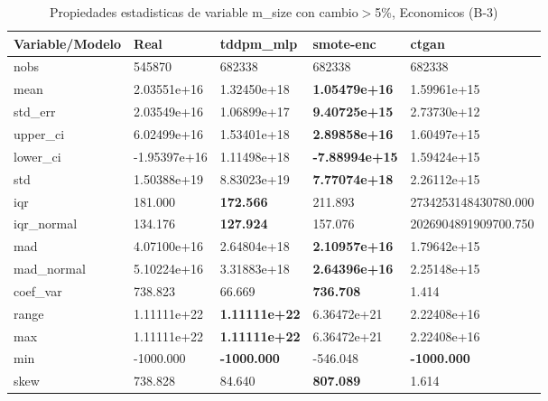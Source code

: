 \begin{table}[H]
\centering
\fontsize{8}{14}\selectfont
\caption{Propiedades estadisticas de variable m\_size con cambio\ensuremath{>}5\%, Economicos (B-3)}
\label{table-stats-economicos-b-3-m_size-short}
\begin{tabular}{|l|m{10em}|m{10em}|m{10em}|m{10em}|}
\hline
 \rowcolor[gray]{0.8}
Variable/Modelo & Real & tddpm\_mlp & smote-enc & ctgan \\
\hline nobs & 545870 & 682338 & 682338 & 682338 \\
\hline mean & 2.03551e+16 & \cellcolor[rgb]{0.9, 0.54, 0.52} 1.32450e+18 & \bfseries 1.05479e+16 & 1.59961e+15 \\
\hline std\_err & 2.03549e+16 & \cellcolor[rgb]{0.9, 0.54, 0.52} 1.06899e+17 & \bfseries 9.40725e+15 & 2.73730e+12 \\
\hline upper\_ci & 6.02499e+16 & \cellcolor[rgb]{0.9, 0.54, 0.52} 1.53401e+18 & \bfseries 2.89858e+16 & 1.60497e+15 \\
\hline lower\_ci & -1.95397e+16 & \cellcolor[rgb]{0.9, 0.54, 0.52} 1.11498e+18 & \bfseries -7.88994e+15 & 1.59424e+15 \\
\hline std & 1.50388e+19 & \cellcolor[rgb]{0.9, 0.54, 0.52} 8.83023e+19 & \bfseries 7.77074e+18 & 2.26112e+15 \\
\hline iqr & 181.000 & \bfseries 172.566 & 211.893 & \cellcolor[rgb]{0.9, 0.54, 0.52} 2734253148430780.000 \\
\hline iqr\_normal & 134.176 & \bfseries 127.924 & 157.076 & \cellcolor[rgb]{0.9, 0.54, 0.52} 2026904891909700.750 \\
\hline mad & 4.07100e+16 & \cellcolor[rgb]{0.9, 0.54, 0.52} 2.64804e+18 & \bfseries 2.10957e+16 & 1.79642e+15 \\
\hline mad\_normal & 5.10224e+16 & \cellcolor[rgb]{0.9, 0.54, 0.52} 3.31883e+18 & \bfseries 2.64396e+16 & 2.25148e+15 \\
\hline coef\_var & 738.823 & 66.669 & \bfseries 736.708 & \cellcolor[rgb]{0.9, 0.54, 0.52} 1.414 \\
\hline range & 1.11111e+22 & \bfseries 1.11111e+22 & 6.36472e+21 & \cellcolor[rgb]{0.9, 0.54, 0.52} 2.22408e+16 \\
\hline max & 1.11111e+22 & \bfseries 1.11111e+22 & 6.36472e+21 & \cellcolor[rgb]{0.9, 0.54, 0.52} 2.22408e+16 \\
\hline min & -1000.000 & \bfseries -1000.000 & \cellcolor[rgb]{0.9, 0.54, 0.52} -546.048 & \bfseries -1000.000 \\
\hline skew & 738.828 & 84.640 & \bfseries 807.089 & \cellcolor[rgb]{0.9, 0.54, 0.52} 1.614 \\

\end{tabular}
\end{table}
